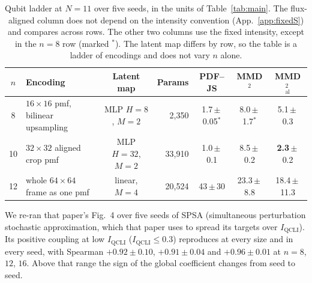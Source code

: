 \documentclass{article}
\newcommand{\qcli}{I_{\mathrm{QCLI}}}
\begin{document}
\begin{table}[!ht]
\centering
\caption{Qubit ladder at $N{=}11$ over five seeds, in the units of Table~\ref{tab:main}. The
flux-aligned column does not depend on the intensity convention (App.~\ref{app:fixedS}) and
compares across rows. The other two columns use the fixed intensity, except in the $n=8$ row
(marked $^{*}$). The latent map differs by row, so the table is a ladder of encodings and does not
vary $n$ alone.}
\label{tab:nsweep}
\scriptsize
\setlength{\tabcolsep}{4pt}
\begin{tabular}{clcrccc}
\toprule
$n$ & Encoding & Latent map & Params & PDF--JS & MMD$^2$ & MMD$^2_{\mathrm{al}}$ \\
\midrule
8  & $16\times16$ pmf, bilinear upsampling & MLP $H{=}8$, $M{=}2$  & 2{,}350  & 1.7\,$\pm$\,0.05$^{*}$ & 8.0\,$\pm$\,1.7$^{*}$ & 5.1\,$\pm$\,0.3 \\
10 & $32\times32$ aligned crop pmf         & MLP $H{=}32$, $M{=}2$ & 33{,}910 & 1.0\,$\pm$\,0.1 & 8.5\,$\pm$\,0.2 & \textbf{2.3}\,$\pm$\,0.2 \\
12 & whole $64\times64$ frame as one pmf   & linear, $M{=}4$       & 20{,}524 & 43\,$\pm$\,30 & 23.3\,$\pm$\,8.8 & 18.4\,$\pm$\,11.3 \\
\bottomrule
\end{tabular}
\end{table}

We re-ran that paper's Fig.~4 over five seeds of SPSA (simultaneous perturbation stochastic
approximation, which that paper uses to spread its targets over $\qcli$). Its positive coupling at low $\qcli$ ($\qcli \le 0.3$)
reproduces at every size and in every seed, with Spearman $+0.92 \pm 0.10$, $+0.91 \pm 0.04$ and
$+0.96 \pm 0.01$ at $n = 8$, $12$, $16$. Above that range the sign of the global coefficient changes
from seed to seed.

\label{app:diffs}
\end{document}
